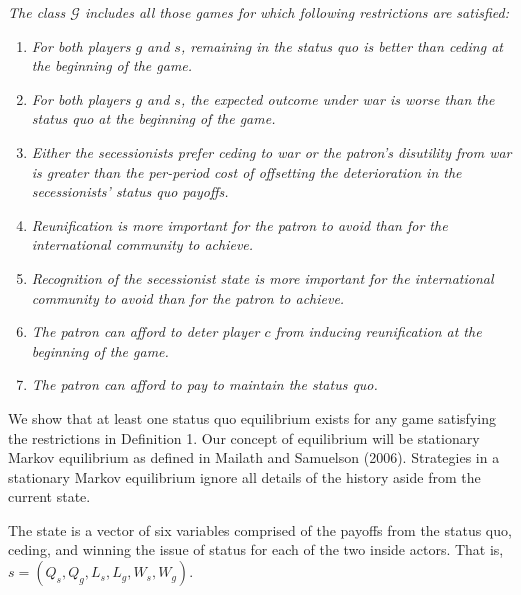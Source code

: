 \begin{definition}
\emph{The class $\mathcal{G}$ includes all those games for which following restrictions are satisfied:}

\begin{enumerate}
\item \textit{For both players $g$ and $s$, remaining in the status quo is better than ceding at the beginning of the game.}\label{res:1}

\item \textit{For both players $g$ and $s$, the expected outcome under war is worse than the status quo at the beginning of the game.}\label{res:2}

\item \textit{Either the secessionists prefer ceding to war or the patron's disutility from war is greater than the per-period cost of offsetting the deterioration in the secessionists' status quo payoffs.}\label{res:new}

\item \textit{Reunification is more important for the patron to avoid than for the international community to achieve.}\label{res:3}

\item  \textit{Recognition of the secessionist state is more important for the international community to avoid than for the patron to achieve.}\label{res:4}

\item  \textit{The patron can afford to deter player $c$ from inducing reunification at the beginning of the game.}\label{res:5}

\item \textit{The patron can afford to pay to maintain the status quo.}\label{res:6}

\end{enumerate}
\end{definition}

We show that at least one status quo equilibrium exists for any game satisfying the restrictions in Definition 1. Our concept of equilibrium will be stationary Markov equilibrium as defined in Mailath and Samuelson (2006). Strategies in a stationary Markov equilibrium ignore all details of the history aside from the current state.

The state is a vector of six variables comprised of the payoffs from the status quo, ceding, and winning the issue of status for each of the two inside actors. That is, $s = \left(Q_s,Q_g,L_s,L_g,W_s,W_g \right)$.

